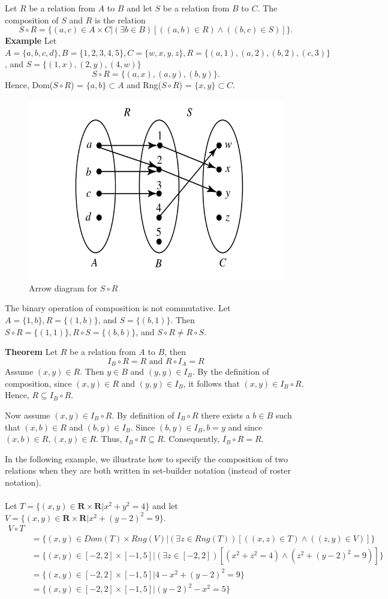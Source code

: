 \documentclass{article}
\begin{document}
    Let $R$ be a relation from $A$ to $B$ and let $S$ be a relation from $B$ to $C$. The composition of $S$ and $R$ is the relation
    $$
    S \circ R = \{(a,c) \in A \times C | (\exists b \in B)[((a,b) \in R) \wedge ((b,c) \in S)]\}.
    $$
    \textbf{Example} Let $A = \{a,b,c,d\}, B = \{1,2,3,4,5\}, C = \{w,x,y,z\}, R = \{(a,1),(a,2),(b,2),(c,3)\}$, and $S = \{(1,x),(2,y),(4,w)\}$
    $$
    S \circ R = \{(a,x),(a,y),(b,y)\}.
    $$
    Hence, Dom($S \circ R$) = $\{a,b\} \subset A$ and Rng($S \circ R$) = $\{x,y\} \subset C$.
    \begin{figure}[h]
    \centering
    \includegraphics[width=0.5\linewidth]{images/relations-1}
    \caption{Arrow diagram for $S \circ R$}
    \end{figure}
    \newpage
    The binary operation of composition is not commutative. Let $A = \{1,b\}, R = \{(1,b)\}$, and $S = \{(b,1)\}$. Then $S \circ R = \{(1,1)\}, R \circ S = \{(b,b)\}$, and $S \circ R \neq R \circ S$.

    \textbf{Theorem} Let $R$ be a relation from $A$ to $B$, then
    $$
    I_B \circ R = R \textrm{ and } R \circ I_A = R
    $$
    Assume $(x,y) \in R$. Then $y \in B$ and $(y,y) \in I_B$. By the definition of composition, since $(x,y) \in R$ and $(y,y) \in I_B$, it follows that $(x,y) \in I_B \circ R$. Hence, $R \subseteq I_B \circ R$.

    Now assume $(x,y) \in I_B \circ R$. By definition of $I_B \circ R$ there exists a $b \in B$ such that $(x,b) \in R$ and $(b,y) \in I_B$. Since $(b,y) \in I_B, b = y$ and since $(x,b) \in R, (x,y) \in R$. Thus, $I_B \circ R \subseteq R$. Consequently, $I_B \circ R = R$.

    In the following example, we illustrate how to specify the composition of two relations when they are both written in set-builder notation (instead of roster notation). \\
    \\
    Let $T = \{(x,y) \in \mathbf{R} \times \mathbf{R} | x^2 + y^2 = 4\}$ and let $V = \{(x,y) \in \mathbf{R} \times \mathbf{R} | x^2 + (y - 2)^2 = 9\}$.
    $$
    \begin{aligned}
    V \circ T \\
    & = \{(x,y) \in Dom(T) \times Rng(V) | (\exists z \in Rng(T))[((x,z) \in T) \wedge ((z,y) \in V)]\} \\
    & = \{(x,y) \in [-2,2] \times [-1,5] | (\exists z \in [-2,2])[(x^2 + z^2 = 4) \wedge (z^2 + (y - 2)^2 = 9)]\} \\
    & = \{(x,y) \in [-2,2] \times [-1,5] | 4 - x^2 + (y - 2)^2 = 9\} \\
    & = \{(x,y) \in [-2,2] \times [-1,5] | (y - 2)^2 - x^2 = 5\} 
    \end{aligned}
    $$
\end{document}
